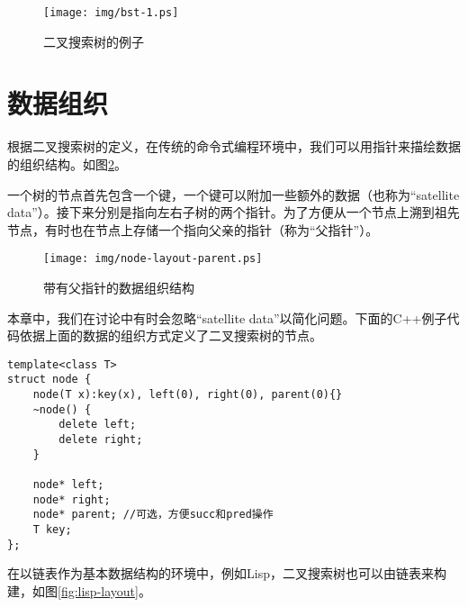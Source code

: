\documentclass{ctexart}
\begin{document}
\begin{figure}[htbp]
  \centering
  \texttt{[image: img/bst-1.ps]}
  \caption{二叉搜索树的例子} \label{fig:bst-example}
\end{figure}


\section{数据组织}

根据二叉搜索树的定义，在传统的命令式编程环境中，我们可以用指针来描绘数据的组织结构。如图\ref{fig:node-layout-parent}。


一个树的节点首先包含一个键，一个键可以附加一些额外的数据（也称为“satellite data”）。接下来分别是指向左右子树的两个指针。为了方便从一个节点上溯到祖先节点，有时也在节点上存储一个指向父亲的指针（称为“父指针”）。

\begin{figure}[htbp]
  \centering
  \texttt{[image: img/node-layout-parent.ps]}
  \caption{带有父指针的数据组织结构} \label{fig:node-layout-parent}
\end{figure}

本章中，我们在讨论中有时会忽略“satellite data”以简化问题。下面的C++例子代码依据上面的数据的组织方式定义了二叉搜索树的节点。

\lstset{language=C++, commentstyle=\rmfamily, texcl=true}
\begin{lstlisting}
template<class T>
struct node {
    node(T x):key(x), left(0), right(0), parent(0){}
    ~node() {
        delete left;
        delete right;
    }

    node* left;
    node* right;
    node* parent; //可选，方便succ和pred操作
    T key;
};
\end{lstlisting}

在以链表作为基本数据结构的环境中，例如Lisp，二叉搜索树也可以由链表来构建，如图\ref{fig:lisp-layout}。
\end{document}

